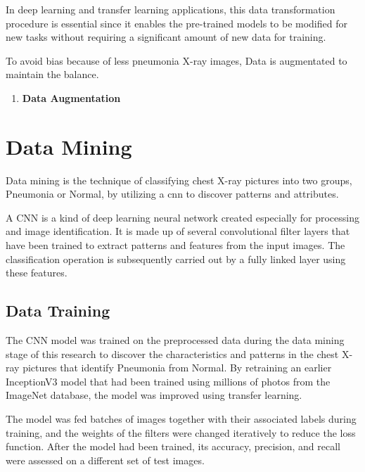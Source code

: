  In deep learning and transfer learning applications, this data transformation procedure is essential since it enables the pre-trained models to be modified for new tasks without requiring a significant amount of new data for training.
  \bigskip
  
  To avoid bias because of less pneumonia X-ray images, Data is augmentated to maintain the balance.
 \begin{enumerate}
 	
 	\item \textbf{Data Augmentation}
 	
 
 \end{enumerate}
 \bigskip
 
 \section{Data Mining}
 
 Data mining is the  technique of classifying chest X-ray pictures into two groups, Pneumonia or Normal, by utilizing a \ac{cnn}  to discover patterns and attributes.
  \bigskip
  
 A CNN is a kind of deep learning neural network created especially for processing and image identification. It is made up of several convolutional filter layers that have been trained to extract patterns and features from the input images. The classification operation is subsequently carried out by a fully linked layer using these features.
 \bigskip
 
 \subsection{Data Training}
 
 The CNN model was trained on the preprocessed data during the data mining stage of this research to discover the characteristics and patterns in the chest X-ray pictures that identify Pneumonia from Normal. By retraining an earlier InceptionV3 model that had been trained using millions of photos from the ImageNet database, the model was improved using transfer learning.
 \bigskip
 
 
 
 
 The model was fed batches of images together with their associated labels during training, and the weights of the filters were changed iteratively to reduce the loss function. After the model had been trained, its accuracy, precision, and recall were assessed on a different set of test images.
 \bigskip
 
